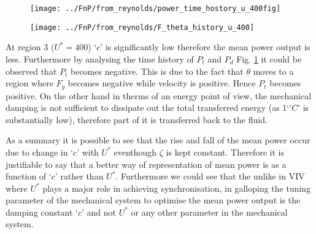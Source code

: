 \begin{figure}
\centering
\texttt{[image: ../FnP/from\_reynolds/power\_time\_hostory\_u\_400fig]}
\caption{}
\label{fig:power_time_hostory_u_400fig}
\end{figure}

\begin{figure}
\centering
\texttt{[image: ../FnP/from\_reynolds/F\_theta\_history\_u\_400]}
\caption{}
\label{fig:F_theta_history_u_400}
\end{figure}


At region 3 ($U^*= 400$) `$c$' is significantly low therefore the mean power output is less. Furthermore by analysing the time history of $P_t$ and $P_d$ Fig. \ref{fig:power_time_hostory_u_400fig} it could be observed that $P_t$ becomes negative. This is due to the fact that $\theta$ moves to a region where $F_y$ becomes negative while velocity is positive. Hence $P_t$ becomes positive. On the other hand in therms of an energy point  of view, the mechanical damping is not sufficient to dissipate out the total transferred energy (as 1`'$C$' is substantially low), therefore  part of it  is transferred back to the fluid. 


As a summary it is possible to see that the rise and fall of the mean power occur due to change in `$c$' with $U^*$ eventhough $\zeta$ is kept constant. Therefore it is justifiable to say that a better way of representation of mean power is as a function of `$c$' rather than $U^*$. Furthermore we could see that the  unlike in VIV where $U^*$ plays a major role in achieving synchronisation, in galloping the tuning parameter of the mechanical system to optimise the mean power output is the damping constant `$c$' and not $U^*$ or any other parameter in the mechanical system.







